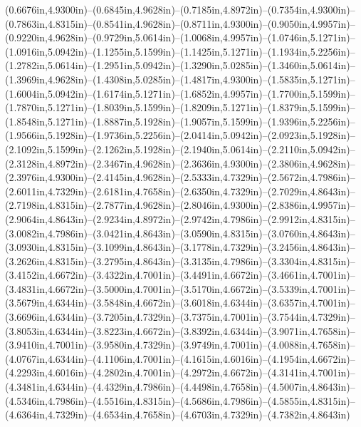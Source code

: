 (0.6676in,4.9300in)--(0.6845in,4.9628in)--(0.7185in,4.8972in)--(0.7354in,4.9300in)--(0.7863in,4.8315in)--(0.8541in,4.9628in)--(0.8711in,4.9300in)--(0.9050in,4.9957in)--(0.9220in,4.9628in)--(0.9729in,5.0614in)--(1.0068in,4.9957in)--(1.0746in,5.1271in)--(1.0916in,5.0942in)--(1.1255in,5.1599in)--(1.1425in,5.1271in)--(1.1934in,5.2256in)--(1.2782in,5.0614in)--(1.2951in,5.0942in)--(1.3290in,5.0285in)--(1.3460in,5.0614in)--(1.3969in,4.9628in)--(1.4308in,5.0285in)--(1.4817in,4.9300in)--(1.5835in,5.1271in)--(1.6004in,5.0942in)--(1.6174in,5.1271in)--(1.6852in,4.9957in)--(1.7700in,5.1599in)--(1.7870in,5.1271in)--(1.8039in,5.1599in)--(1.8209in,5.1271in)--(1.8379in,5.1599in)--(1.8548in,5.1271in)--(1.8887in,5.1928in)--(1.9057in,5.1599in)--(1.9396in,5.2256in)--(1.9566in,5.1928in)--(1.9736in,5.2256in)--(2.0414in,5.0942in)--(2.0923in,5.1928in)--(2.1092in,5.1599in)--(2.1262in,5.1928in)--(2.1940in,5.0614in)--(2.2110in,5.0942in)--(2.3128in,4.8972in)--(2.3467in,4.9628in)--(2.3636in,4.9300in)--(2.3806in,4.9628in)--(2.3976in,4.9300in)--(2.4145in,4.9628in)--(2.5333in,4.7329in)--(2.5672in,4.7986in)--(2.6011in,4.7329in)--(2.6181in,4.7658in)--(2.6350in,4.7329in)--(2.7029in,4.8643in)--(2.7198in,4.8315in)--(2.7877in,4.9628in)--(2.8046in,4.9300in)--(2.8386in,4.9957in)--(2.9064in,4.8643in)--(2.9234in,4.8972in)--(2.9742in,4.7986in)--(2.9912in,4.8315in)--(3.0082in,4.7986in)--(3.0421in,4.8643in)--(3.0590in,4.8315in)--(3.0760in,4.8643in)--(3.0930in,4.8315in)--(3.1099in,4.8643in)--(3.1778in,4.7329in)--(3.2456in,4.8643in)--(3.2626in,4.8315in)--(3.2795in,4.8643in)--(3.3135in,4.7986in)--(3.3304in,4.8315in)--(3.4152in,4.6672in)--(3.4322in,4.7001in)--(3.4491in,4.6672in)--(3.4661in,4.7001in)--(3.4831in,4.6672in)--(3.5000in,4.7001in)--(3.5170in,4.6672in)--(3.5339in,4.7001in)--(3.5679in,4.6344in)--(3.5848in,4.6672in)--(3.6018in,4.6344in)--(3.6357in,4.7001in)--(3.6696in,4.6344in)--(3.7205in,4.7329in)--(3.7375in,4.7001in)--(3.7544in,4.7329in)--(3.8053in,4.6344in)--(3.8223in,4.6672in)--(3.8392in,4.6344in)--(3.9071in,4.7658in)--(3.9410in,4.7001in)--(3.9580in,4.7329in)--(3.9749in,4.7001in)--(4.0088in,4.7658in)--(4.0767in,4.6344in)--(4.1106in,4.7001in)--(4.1615in,4.6016in)--(4.1954in,4.6672in)--(4.2293in,4.6016in)--(4.2802in,4.7001in)--(4.2972in,4.6672in)--(4.3141in,4.7001in)--(4.3481in,4.6344in)--(4.4329in,4.7986in)--(4.4498in,4.7658in)--(4.5007in,4.8643in)--(4.5346in,4.7986in)--(4.5516in,4.8315in)--(4.5686in,4.7986in)--(4.5855in,4.8315in)--(4.6364in,4.7329in)--(4.6534in,4.7658in)--(4.6703in,4.7329in)--(4.7382in,4.8643in) 